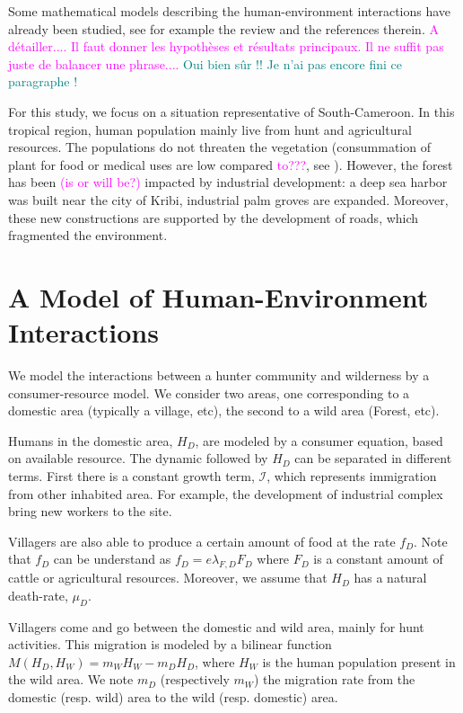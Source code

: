 \documentclass{article}
\newcommand{\lfd}{\lambda_{F, D}}
\newcommand{\cI}{\mathcal{I}}
\newcommand{\marc}[1]{\textcolor{teal}{#1}}
\newcommand{\YD}[1]{\textcolor{magenta}{#1}}
\begin{document}
Some mathematical models describing the human-environment interactions have already been studied, see for example the review \cite{fanuel_modelling_2023} and the references therein. \YD{A détailler.... Il faut donner les hypothèses et résultats principaux. Il ne suffit pas juste de balancer une phrase....} \marc{Oui bien sûr !! Je n'ai pas encore fini ce paragraphe !}

For this study, we focus on a situation representative of South-Cameroon. In this tropical region, human population mainly live from hunt and agricultural resources. The populations do not threaten the vegetation (consummation of plant for food or medical uses are low compared \YD{to???}, see \cite{koppert_consommation_1996}). However, the forest has been \YD{(is or will be?)} impacted by industrial development: a deep sea harbor was built near the city of Kribi, industrial palm groves are expanded. Moreover, these new constructions are supported by the development of roads, which fragmented the environment.

\section{A Model of Human-Environment Interactions}

We model the interactions between a hunter community and wilderness by a consumer-resource model. We consider two areas, one corresponding to a domestic area (typically a village, etc), the second to a wild area (Forest, etc).

Humans in the domestic area, $H_D$, are modeled by a consumer equation, based on available resource. The dynamic followed by $H_D$ can be separated in different terms. 
First there is a constant growth term, $\cI$, which represents immigration from other inhabited area. For example, the development of industrial complex bring new workers to the site.

Villagers are also able to produce a certain amount of food at the rate $f_D$. Note that $f_D$ can be understand as $f_D = e \lfd F_D$ where $F_D$ is a constant amount of cattle or agricultural resources. 
Moreover, we assume that $H_D$ has a natural death-rate, $\mu_D$.

Villagers come and go between the domestic and wild area, mainly for hunt activities. This migration is modeled by a bilinear function $M(H_D, H_W) = m_W H_W - m_D H_D$, where $H_W$ is the human population present in the wild area. We note $m_D$ (respectively $m_W$) the migration rate from the domestic (resp. wild) area to the wild (resp. domestic) area.
\end{document}
